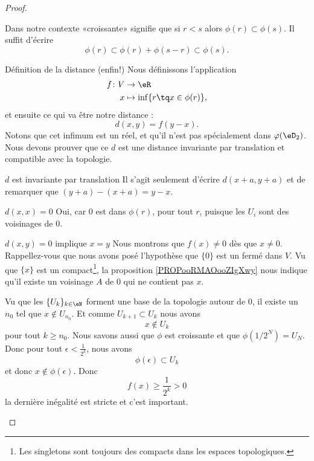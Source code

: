 \begin{proof}
\begin{subproof}
\begin{subproof}
        Dans notre contexte «croissante» signifie que si \(r < s \) alors \( \phi(r) \subset \phi(s) \). Il suffit d'écrire
        \begin{equation}
        \phi(r) \subset \phi(r) + \phi(s-r) \subset \phi(s).
        \end{equation}
            \end{subproof}
        \item[Définition de la distance (enfin!)]
            Nous définissons l'application
            \begin{equation}
                \begin{aligned}
                    f\colon V&\to \eR \\
                    x&\mapsto \inf\{ r\tq x\in\phi(r) \}, 
                \end{aligned}
            \end{equation}
            et ensuite ce qui va être notre distance :
            \begin{equation}\label{EqDefDistanceCompatible}
                d(x,y) = f(y-x).
            \end{equation}
    Notons que cet infimum est un réel, et qu'il n'est pas spécialement dans \( \varphi(\eD_2)\). Nous devons prouver que ce \( d\) est une distance invariante par translation et compatible avec la topologie.
\item[\( d\) est invariante par translation]
        Il s'agit seulement d'écrire \( d(x+a,y+a)\) et de remarquer que \( (y+a)-(x+a)=y-x\).
    \item [$d(x,x) = 0$] Oui, car \(0\) est dans \(\phi(r)\), pour tout \(r \), puisque les \( U_i \) sont des voisinages de \(0\).
\item[\( d(x,y)=0\) implique \( x=y\)]
    Nous montrons que \( f(x)\neq 0\) dès que \( x\neq 0\). Rappellez-vous que nous avons posé l'hypothèse que \( \{ 0 \}\) est un fermé dans \( V\). Vu que \( \{ x \}\) est un compact\footnote{Les singletons sont toujours des compacts dans les espaces topologiques.}, la proposition \ref{PROPooRMAOooZIgXwy} nous indique qu'il existe un voisinage \( A\) de \( 0\) qui ne contient pas \( x\).

    Vu que les \( \{ U_k \}_{k\in \eN}\) forment une base de la topologie autour de \( 0\), il existe un \( n_0\) tel que \( x\notin U_{n_0}\). Et comme \( U_{k+1}\subset U_k\) nous avons
    \begin{equation}
        x\notin U_k
    \end{equation}
    pour tout \( k\geq n_0\). Nous savons aussi que \( \phi\) est croissante et que \( \phi(1/2^N)=U_N\). Donc pour tout \( \epsilon<\frac{1}{ 2^k }\), nous avons
    \begin{equation}
        \phi(\epsilon)\subset U_k
    \end{equation}
    et donc \( x\notin \phi(\epsilon)\). Donc 
    \begin{equation}
        f(x)\geq \frac{1}{ 2^k }>0
    \end{equation}
    la dernière inégalité est stricte et c'est important.


\end{subproof}
\end{proof}
